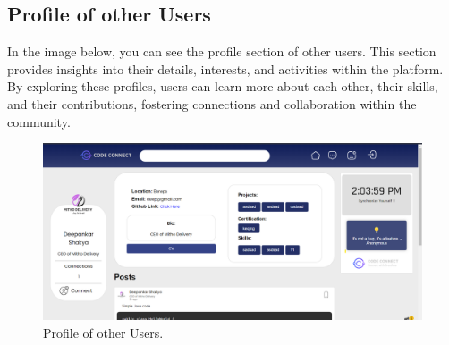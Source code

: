 \subsection{Profile of other Users}
In the image below, you can see the profile section of other users. This section provides insights into their details, interests, and activities within the platform. By exploring these profiles, users can learn more about each other, their skills, and their contributions, fostering connections and collaboration within the community.
\begin{figure}[ht]
    \centering
    \includegraphics[width=1\textwidth]{Outcome-ss/other-user-profile.png}
    \caption{Profile of other Users.}
    \label{fig:Profile of other Users}
\end{figure}
\newpage
